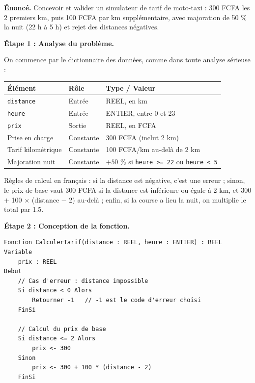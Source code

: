 \documentclass[11pt]{article}
\begin{document}
\begin{exoresolu}
\textbf{Énoncé.} Concevoir et valider un simulateur de tarif de moto-taxi : \num{300} FCFA les \num{2} premiers km, puis \num{100} FCFA par km supplémentaire, avec majoration de \num{50} \% la nuit (22 h à 5 h) et rejet des distances négatives.

\tcblower

\textbf{Étape 1 : Analyse du problème.}\par
On commence par le dictionnaire des données, comme dans toute analyse sérieuse :

\begin{center}
\begin{tabularx}{\linewidth}{|l|l|X|}
\hline
\rowcolor{popblueL}
\textbf{Élément} & \textbf{Rôle} & \textbf{Type / Valeur} \\
\hline
\texttt{distance} & Entrée & REEL, en km \\
\hline
\texttt{heure} & Entrée & ENTIER, entre 0 et 23 \\
\hline
\texttt{prix} & Sortie & REEL, en FCFA \\
\hline
Prise en charge & Constante & \num{300} FCFA (inclut \num{2} km) \\
\hline
Tarif kilométrique & Constante & \num{100} FCFA/km au-delà de \num{2} km \\
\hline
Majoration nuit & Constante & $+50$ \% si \texttt{heure >= 22} ou \texttt{heure < 5} \\
\hline
\end{tabularx}
\end{center}

Règles de calcul en français : si la distance est négative, c'est une erreur ; sinon, le prix de base vaut \num{300} FCFA si la distance est inférieure ou égale à \num{2} km, et \num{300} $+$ \num{100} $\times$ (distance $-$ \num{2}) au-delà ; enfin, si la course a lieu la nuit, on multiplie le total par \num{1,5}.

\medskip
\textbf{Étape 2 : Conception de la fonction.}\par
\begin{lstlisting}
Fonction CalculerTarif(distance : REEL, heure : ENTIER) : REEL
Variable
    prix : REEL
Debut
    // Cas d'erreur : distance impossible
    Si distance < 0 Alors
        Retourner -1   // -1 est le code d'erreur choisi
    FinSi

    // Calcul du prix de base
    Si distance <= 2 Alors
        prix <- 300
    Sinon
        prix <- 300 + 100 * (distance - 2)
    FinSi


\end{lstlisting}
\end{exoresolu}
\end{document}
